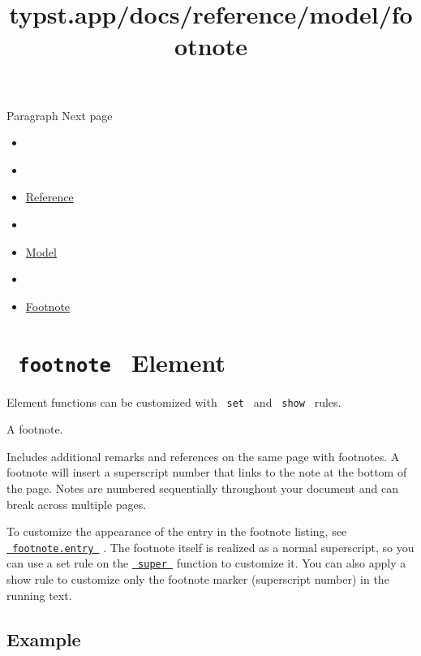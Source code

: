 { Paragraph } { Next page }


\title{typst.app/docs/reference/model/footnote}

\begin{itemize}
\tightlist
\item
  \href{/docs}{}
\item
  
\item
  \href{/docs/reference/}{Reference}
\item
  
\item
  \href{/docs/reference/model/}{Model}
\item
  
\item
  \href{/docs/reference/model/footnote/}{Footnote}
\end{itemize}

\section{\texorpdfstring{\texttt{\ footnote\ } {{ Element
}}}{ footnote   Element }}\label{summary}

\label{element-tooltip}
Element functions can be customized with \texttt{\ set\ } and
\texttt{\ show\ } rules.

A footnote.

Includes additional remarks and references on the same page with
footnotes. A footnote will insert a superscript number that links to the
note at the bottom of the page. Notes are numbered sequentially
throughout your document and can break across multiple pages.

To customize the appearance of the entry in the footnote listing, see
\href{/docs/reference/model/footnote/\#definitions-entry}{\texttt{\ footnote.entry\ }}
. The footnote itself is realized as a normal superscript, so you can
use a set rule on the
\href{/docs/reference/text/super/}{\texttt{\ super\ }} function to
customize it. You can also apply a show rule to customize only the
footnote marker (superscript number) in the running text.

\subsection{Example}\label{example}

